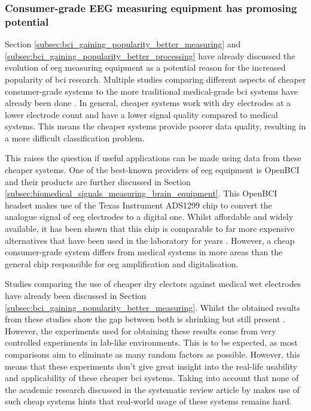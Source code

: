 
\subsubsection{Consumer-grade EEG measuring equipment has promosing potential}
\label{subsubsec:bci_opportunities_obstacles_motivating_cheap_hardware_promosing}

Section \ref{subsec:bci_gaining_popularity_better_measuring} and \ref{subsec:bci_gaining_popularity_better_processing} have already discussed the evolution of \gls{eeg} measuring equipment as a potential reason for the increased popularity of \gls{bci} research.
Multiple studies comparing different aspects of cheaper consumer-grade systems to the more traditional medical-grade \gls{bci} systems have already been done \citep{openbci_vs_medical, openbci_eeg_sensor_evaluation, dry_electrode_status, wet_dry_comparison_experiment, wireless_dry_vs_wired_wet}.
In general, cheaper systems work with dry electrodes at a lower electrode count and have a lower signal quality compared to medical systems.
This means the cheaper systems provide poorer data quality, resulting in a more difficult classification problem.

This raises the question if useful applications can be made using data from these cheaper systems.
One of the best-known providers of \gls{eeg} equipment is OpenBCI and their products are further discussed in Section \ref{subsec:biomedical_signals_measuring_brain_equipment}.
This OpenBCI headset makes use of the Texas Instrument ADS1299 chip to convert the analogue signal of \gls{eeg} electrodes to a digital one.
Whilst affordable and widely available, it has been shown that this chip is comparable to far more expensive alternatives that have been used in the laboratory for years \citep{openbci_eeg_sensor_evaluation, openbci_vs_medical}.
However, a cheap consumer-grade system differs from medical systems in more areas than the general chip responsible for \gls{eeg} amplification and digitalisation.

Studies comparing the use of cheaper dry electors against medical wet electrodes have already been discussed in Section \ref{subsec:bci_gaining_popularity_better_measuring}.
Whilst the obtained results from these studies show the gap between both is shrinking but still present \citep{wet_vs_dry, dry_electrode_status, wet_dry_comparison_experiment}.
However, the experiments used for obtaining these results come from very controlled experiments in lab-like environments.
This is to be expected, as most comparisons aim to eliminate as many random factors as possible.
However, this means that these experiments don't give great insight into the real-life usability and applicability of these cheaper \gls{bci} systems.
Taking into account that none of the academic research discussed in the systematic review article by \citet{bci_review_arnau} makes use of such cheap systems hints that real-world usage of these systems remains hard.


